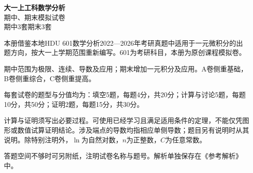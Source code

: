 \documentclass[11pt,a4paper,fontset=fandol]{ctexart}
\begin{document}
\begin{center}
{\Huge\bfseries 大一上工科数学分析}\\[8mm]
{\LARGE 期中、期末模拟试卷}\\[6mm]
{\Large 期中3套\quad 期末3套}
\end{center}
\vspace{10mm}
本册借鉴本地HDU 601数学分析2022—2026年考研真题中适用于一元微积分的出题方向，按大一上学期范围重新编写。601为考研科目，本册为原创课程模拟卷。

期中范围为极限、连续、导数及应用；期末增加一元积分及应用。A卷侧重基础，B卷侧重综合，C卷侧重提高。

每套试卷的题型与分值均为：填空5题，每题4分，共20分；计算与讨论5题，每题10分，共50分；证明2题，每题15分，共30分。

计算与证明须写出必要过程。可使用已经学习且满足适用条件的定理，不能仅凭图形或数值试算证明结论。涉及端点的导数均指相应单侧导数；题目另有说明时从其说明。除特别注明外，$\ln$为自然对数，$n$为正整数，$C$为任意常数。

答题空间不够时可另附纸，注明试卷名称与题号。解析单独保存在《参考解析》中。
\end{document}
